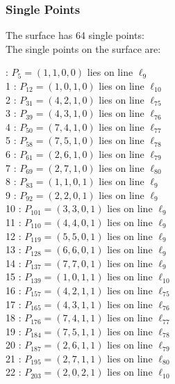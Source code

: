 \documentclass{article}
\begin{document}
{\subsubsection*{Single Points}
The surface has 64 single points:\\
The single points on the surface are:\\
\begin{multicols}{2}
 : $P_{5}=( 1, 1, 0, 0 )$ lies on line $\ell_{9}$\\
1 : $P_{12}=( 1, 0, 1, 0 )$ lies on line $\ell_{10}$\\
2 : $P_{31}=( 4, 2, 1, 0 )$ lies on line $\ell_{75}$\\
3 : $P_{39}=( 4, 3, 1, 0 )$ lies on line $\ell_{76}$\\
4 : $P_{50}=( 7, 4, 1, 0 )$ lies on line $\ell_{77}$\\
5 : $P_{58}=( 7, 5, 1, 0 )$ lies on line $\ell_{78}$\\
6 : $P_{61}=( 2, 6, 1, 0 )$ lies on line $\ell_{79}$\\
7 : $P_{69}=( 2, 7, 1, 0 )$ lies on line $\ell_{80}$\\
8 : $P_{83}=( 1, 1, 0, 1 )$ lies on line $\ell_{9}$\\
9 : $P_{92}=( 2, 2, 0, 1 )$ lies on line $\ell_{9}$\\
10 : $P_{101}=( 3, 3, 0, 1 )$ lies on line $\ell_{9}$\\
11 : $P_{110}=( 4, 4, 0, 1 )$ lies on line $\ell_{9}$\\
12 : $P_{119}=( 5, 5, 0, 1 )$ lies on line $\ell_{9}$\\
13 : $P_{128}=( 6, 6, 0, 1 )$ lies on line $\ell_{9}$\\
14 : $P_{137}=( 7, 7, 0, 1 )$ lies on line $\ell_{9}$\\
15 : $P_{139}=( 1, 0, 1, 1 )$ lies on line $\ell_{10}$\\
16 : $P_{157}=( 4, 2, 1, 1 )$ lies on line $\ell_{75}$\\
17 : $P_{165}=( 4, 3, 1, 1 )$ lies on line $\ell_{76}$\\
18 : $P_{176}=( 7, 4, 1, 1 )$ lies on line $\ell_{77}$\\
19 : $P_{184}=( 7, 5, 1, 1 )$ lies on line $\ell_{78}$\\
20 : $P_{187}=( 2, 6, 1, 1 )$ lies on line $\ell_{79}$\\
21 : $P_{195}=( 2, 7, 1, 1 )$ lies on line $\ell_{80}$\\
22 : $P_{203}=( 2, 0, 2, 1 )$ lies on line $\ell_{10}$\\

\end{multicols}}
\end{document}
